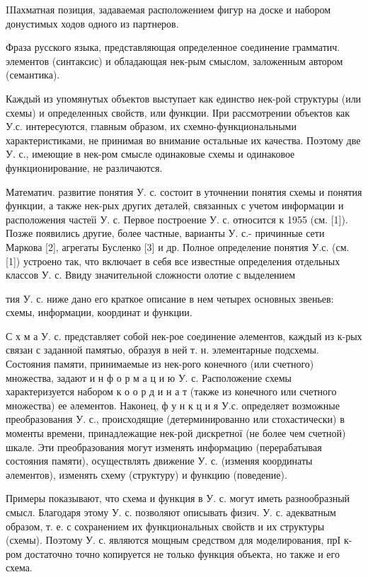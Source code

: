 \documentclass[10pt]{article}
\begin{document}
IIІахматная позиция, задаваемая расположением фигур на доске и набором донустимых ходов одного из партнеров.



Фраза русского языка, представляющая определенное соединение грамматич. элементов (синтаксис) и обладающая нек-рым смыслом, заложенным автором (семантика).



Каждый из упомянутых объектов выступает как единство нек-рой структуры (или схемы) и определенных свойств, или функции. ІІри рассмотрении объектов как У.с. интересуются, главным образом, их схемно-функциональными характеристиками, не принимая во внимание остальные их качества. Поэтому две У. с., имеющие в нек-ром смысле одинаковые схемы и одинаковое функционирование, не различаются.



Математич. развитие понятия У. с. состоит в уточнении понятия схемы и понятия функции, а также нек-рых других деталей, связанных с учетом информации и расположения частеїі У. с. Первое построение У. с. относится к 1955 (см. [1]). Позже появились другие, более частные, варианты У. с.- причинные сети Маркова [2], агрегаты Бусленко [3] и др. Полное определение понятия У.с. (см. [1]) устроено так, что включает в себя все известные определения отдельных классов У. с. Ввиду значительной сложности олотие с выделением

тия $У$. с. ниже дано его краткое описание в нем четырех основных звеньев: схемы, информации, координат и функции.



С х м а У. с. представляет собой нек-рое соединение әлементов, каждый из к-рых связан с заданной памятью, образуя в ней т. н. элементарные подсхемы. Состояния памяти, принимаемые из нек-рого конечного (или счетного) множества, задают и н ф о р м а ц и ю У. с. Расположение схемы характеризуется набором к о о р д и н а т (также из конечного или счетного множества) ее әлементов. Наконец, ф у н к ц и я У.с. определяет возможные преобразования У. с., происходящие (детерминированно или стохастически) в моменты времени, принадлежащие нек-рой дискретної (не более чем счетной) шкале. Эти преобразования могут изменять информацию (перерабатывая состояния памяти), осуществлять движение У. с. (изменяя координаты әлементов), изменять схему (структуру) и функцию (поведение).



Примеры показывают, что схема и функция в У. с. могут иметь разнообразный смысл. Благодаря этому У. с. позволяют описывать физич. У. с. адекватным образом, т. е. с сохранением их функциональных свойств и их структуры (схемы). Поэтому У. с. являются мощным средством для моделирования, прІ к-ром достаточно точно копируется не только функция объекта, но также и его схема.
\end{document}
